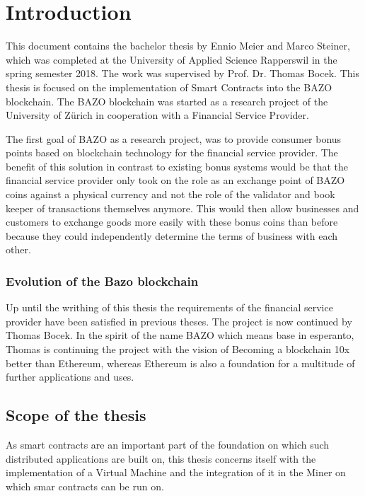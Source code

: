 \chapter{Introduction}
\thispagestyle{main} %

This document contains the bachelor thesis by Ennio Meier and Marco Steiner, which was completed at the University of Applied Science Rapperswil in the spring semester 2018. The work was supervised by Prof. Dr. Thomas Bocek.
This thesis is focused on the implementation of Smart Contracts into the BAZO blockchain. The BAZO blockchain was started as a research project of the University of Zürich in cooperation with a Financial Service Provider. 

The first goal of BAZO as a research project, was to provide consumer bonus points based on blockchain technology for the financial service provider. The benefit of this solution in contrast to existing bonus systems would be that the financial service provider only took on the role as an exchange point of BAZO coins against a physical currency and not the role of the validator and book keeper of transactions themselves anymore. This would then allow businesses and customers to exchange goods more easily with these bonus coins than before because they could independently determine the terms of business with each other.

\subsection{Evolution of the Bazo blockchain}
Up until the writhing of this thesis the requirements of the financial service provider have been satisfied in previous theses. The project is now continued by Thomas Bocek. In the spirit of the name BAZO which means base in esperanto, Thomas is continuing the project with the vision of \flqq Becoming a blockchain 10x better than Ethereum\frqq, whereas Ethereum is also a foundation for a multitude of further applications and uses.

\section{Scope of the thesis}
As smart contracts are an important part of the foundation on which such distributed applications are built on, this thesis concerns itself with the implementation of a Virtual Machine and the integration of it in the Miner on which smar contracts can be run on.

